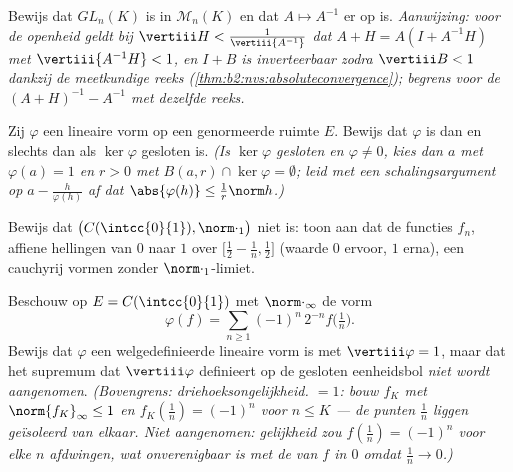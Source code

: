 \begin{exercise}[$\star\star$]\label{exo:b2:nvs:5}
Bewijs dat $GL_n(K)$  is in $\mathcal{M}_n(K)$ en dat $A
\mapsto A^{-1}$ er  op is. \emph{Aanwijzing: voor de
openheid geldt bij $\vertiii H < \frac{1}{\vertiii{A^{-1}}}$ dat $A
+ H = A(I + A^{-1}H)$ met $\vertiii{A^{-1}H} < 1$, en $I + B$ is
inverteerbaar zodra $\vertiii B < 1$ dankzij de meetkundige reeks
(\cref{thm:b2:nvs:absoluteconvergence}); begrens voor de
 $(A+H)^{-1} - A^{-1}$ met dezelfde reeks.}
\end{exercise}

\begin{exercise}[$\star\star$]\label{exo:b2:nvs:6}
Zij $\varphi$ een lineaire vorm op een genormeerde ruimte $E$.
Bewijs dat $\varphi$  is dan en slechts dan als
$\ker\varphi$ gesloten is. \emph{(Is $\ker\varphi$ gesloten en
$\varphi \neq 0$, kies dan $a$ met $\varphi(a) = 1$ en $r > 0$ met
$B(a, r) \cap \ker\varphi = \emptyset$; leid met een
schalingsargument op $a - \frac{h}{\varphi(h)}$ af dat
$\abs{\varphi(h)} \leq \frac{1}{r}\norm h$.)}
\end{exercise}

\begin{exercise}[$\star\star$]\label{exo:b2:nvs:7}
Bewijs dat $\bigl(C(\intcc{0}{1}), \norm\cdot_1\bigr)$ niet
 is: toon aan dat de functies $f_n$, affiene hellingen van
$0$ naar $1$ over $\bigl[\frac12 - \frac1n, \frac12\bigr]$ (waarde
$0$ ervoor, $1$ erna), een cauchyrij vormen zonder 
$\norm\cdot_1$-limiet.
\end{exercise}

\begin{exercise}[$\star\star\star$]\label{exo:b2:nvs:8}
Beschouw op $E = C(\intcc{0}{1})$ met $\norm\cdot_\infty$ de vorm
\[
\varphi(f) = \sum_{n \geq 1} (-1)^n\, 2^{-n} f\bigl(\tfrac1n\bigr).
\]
Bewijs dat $\varphi$ een welgedefinieerde  lineaire vorm is
met $\vertiii\varphi = 1$, maar dat het supremum dat
$\vertiii\varphi$ definieert op de gesloten eenheidsbol \emph{niet
wordt aangenomen}. \emph{(Bovengrens: driehoeksongelijkheid. 
$= 1$: bouw  $f_K$ met $\norm{f_K}_\infty \leq 1$ en
$f_K(\frac1n) = (-1)^n$ voor $n \leq K$ --- de punten $\frac1n$
liggen geïsoleerd van elkaar. Niet aangenomen: gelijkheid zou
$f(\frac1n) = (-1)^n$ voor elke $n$ afdwingen, wat onverenigbaar is
met de  van $f$ in $0$ omdat $\frac1n \to 0$.)}
\end{exercise}

